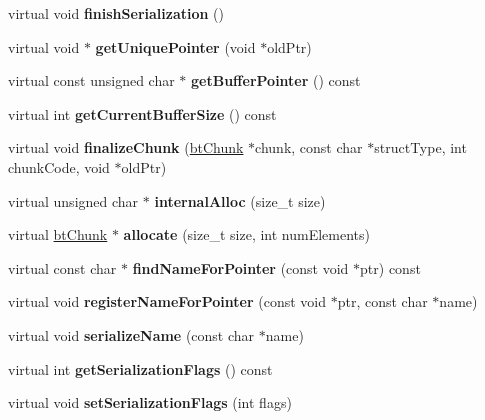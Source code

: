 \begin{DoxyCompactItemize}
virtual void {\bfseries finish\+Serialization} ()
\item 
\mbox{\label{classbtDefaultSerializer_a523b964568de9613eb3325583338c55b}} 
virtual void $\ast$ {\bfseries get\+Unique\+Pointer} (void $\ast$old\+Ptr)
\item 
\mbox{\label{classbtDefaultSerializer_a05e00aa176a4898b4099962e0374a4f1}} 
virtual const unsigned char $\ast$ {\bfseries get\+Buffer\+Pointer} () const
\item 
\mbox{\label{classbtDefaultSerializer_a8419c7a7a73b90c152557a943f056506}} 
virtual int {\bfseries get\+Current\+Buffer\+Size} () const
\item 
\mbox{\label{classbtDefaultSerializer_a885c6fa611ad8ccb923af7a3fa7c6e93}} 
virtual void {\bfseries finalize\+Chunk} (\hyperlink{classbtChunk}{bt\+Chunk} $\ast$chunk, const char $\ast$struct\+Type, int chunk\+Code, void $\ast$old\+Ptr)
\item 
\mbox{\label{classbtDefaultSerializer_ac0280f12b9476be3e60e1dd9ff21d5e2}} 
virtual unsigned char $\ast$ {\bfseries internal\+Alloc} (size\+\_\+t size)
\item 
\mbox{\label{classbtDefaultSerializer_a46e3eb69e93e640fe253731ca701d9bf}} 
virtual \hyperlink{classbtChunk}{bt\+Chunk} $\ast$ {\bfseries allocate} (size\+\_\+t size, int num\+Elements)
\item 
\mbox{\label{classbtDefaultSerializer_a0a44d8a84246d2c7da819389195889df}} 
virtual const char $\ast$ {\bfseries find\+Name\+For\+Pointer} (const void $\ast$ptr) const
\item 
\mbox{\label{classbtDefaultSerializer_a7676d536d11cca634b65bd2899cf20f2}} 
virtual void {\bfseries register\+Name\+For\+Pointer} (const void $\ast$ptr, const char $\ast$name)
\item 
\mbox{\label{classbtDefaultSerializer_a481719115145d98cb9fac2abb36b53f5}} 
virtual void {\bfseries serialize\+Name} (const char $\ast$name)
\item 
\mbox{\label{classbtDefaultSerializer_a4fefe4895fed67fa5c6c65efb37c3f60}} 
virtual int {\bfseries get\+Serialization\+Flags} () const
\item 
\mbox{\label{classbtDefaultSerializer_a0efbc130ca12590028ab5e30c7e0c54d}} 
virtual void {\bfseries set\+Serialization\+Flags} (int flags)
\end{DoxyCompactItemize}

